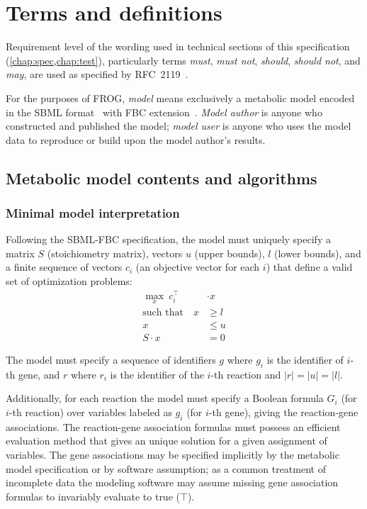 \section{Terms and definitions}

Requirement level of the wording used in technical sections of this specification (\cref{chap:spec,chap:test}), particularly terms \emph{must}, \emph{must not}, \emph{should}, \emph{should not}, and \emph{may}, are used as specified by RFC~2119~\cite{rfc2119}.

For the purposes of FROG, \emph{model} means exclusively a metabolic model encoded in the SBML format~\cite{hucka2003systems,keating2020sbml} with FBC extension~\cite{olivier2018sbmlfbc}. \emph{Model author} is anyone who constructed and published the model; \emph{model user} is anyone who uses the model data to reproduce or build upon the model author's results.

\subsection{Metabolic model contents and algorithms}
\label{sec:algos}

\subsubsection{Minimal model interpretation}

Following the SBML-FBC specification, the model must uniquely specify a matrix $S$ (stoichiometry matrix), vectors $u$ (upper bounds), $l$ (lower bounds), and a finite sequence of vectors $c_i$ (an objective vector for each $i$) that define a valid set of optimization problems:
\begin{align*}
\max_x\ c_i^\intercal &\cdot x \\
\text{such that}\quad
x & \geq l \\
x & \leq u \\
S\cdot x &= 0
\end{align*}

The model must specify a sequence of identifiers $g$ where $g_i$ is the identifier of $i$-th gene, and $r$ where $r_i$ is the identifier of the $i$-th reaction and $|r| = |u| = |l|$.

Additionally, for each reaction the model must specify a Boolean formula $G_i$ (for $i$-th reaction) over variables labeled as $g_i$ (for $i$-th gene), giving the reaction-gene associations.
The reaction-gene association formulas must possess an efficient evaluation method that gives an unique solution for a given assignment of variables.
The gene associations may be specified implicitly by the metabolic model specification or by software assumption; as a common treatment of incomplete data the modeling software may assume missing gene association formulas to invariably evaluate to true ($\top$).

